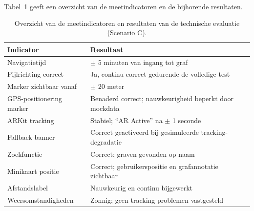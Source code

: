 Tabel~\ref{tab:testresultaten} geeft een overzicht van de meetindicatoren en
de bijhorende resultaten.

\begin{table}[h]
    \centering
    \caption[Overzicht testresultaten]{Overzicht van de meetindicatoren en
        resultaten van de technische evaluatie (Scenario C).}
    \label{tab:testresultaten}
    \renewcommand{\arraystretch}{1.4}
    \begin{tabular}{p{4.5cm} p{7.5cm}}
        \hline
        \textbf{Indicator} & \textbf{Resultaat} \\
        \hline
        Navigatietijd & $\pm$ 5 minuten van ingang tot graf \\
        \hline
        Pijlrichting correct & Ja, continu correct gedurende de volledige test \\
        \hline
        Marker zichtbaar vanaf & $\pm$ 20 meter \\
        \hline
        GPS-positionering marker & Benaderd correct; nauwkeurigheid beperkt door mockdata \\
        \hline
        ARKit tracking & Stabiel; ``AR Active'' na $\pm$ 1 seconde \\
        \hline
        Fallback-banner & Correct geactiveerd bij gesimuleerde tracking-degradatie \\
        \hline
        Zoekfunctie & Correct; graven gevonden op naam \\
        \hline
        Minikaart positie & Correct; gebruikerspositie en grafannotatie zichtbaar \\
        \hline
        Afstandslabel & Nauwkeurig en continu bijgewerkt \\
        \hline
        Weersomstandigheden & Zonnig; geen tracking-problemen vastgesteld \\
        \hline
    \end{tabular}
\end{table}

